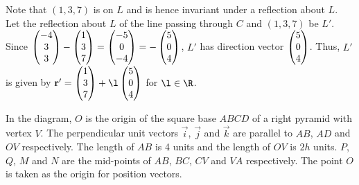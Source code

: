 \documentclass{echw}
\begin{document}

            Note that $(1, 3, 7)$ is on $L$ and is hence invariant under a reflection about $L$. Let the reflection about $L$ of the line passing through $C$ and $(1, 3, 7)$ be $L'$. Since $\begin{pmatrix} -4 \\ 3 \\ 3 \end{pmatrix} - \begin{pmatrix} 1 \\ 3 \\ 7 \end{pmatrix} = \begin{pmatrix} -5 \\ 0 \\ -4 \end{pmatrix} = -\begin{pmatrix} 5 \\ 0 \\ 4 \end{pmatrix}$, $L'$ has direction vector $\begin{pmatrix} 5 \\ 0 \\ 4 \end{pmatrix}$. Thus, $L'$ is given by $\vec r' = \cveciii137 + \l \cveciii504$ for $\l \in \R$.


    \problem{}
        \begin{center}
        \end{center}
        In the diagram, $O$ is the origin of the square base $ABCD$ of a right pyramid with vertex $V$. The perpendicular unit vectors $\vec i$, $\vec j$ and $\vec k$ are parallel to $AB$, $AD$ and $OV$ respectively. The length of $AB$ is 4 units and the length of $OV$ is $2h$ units. $P$, $Q$, $M$ and $N$ are the mid-points of $AB$, $BC$, $CV$ and $VA$ respectively. The point $O$ is taken as the origin for position vectors.
\end{document}
